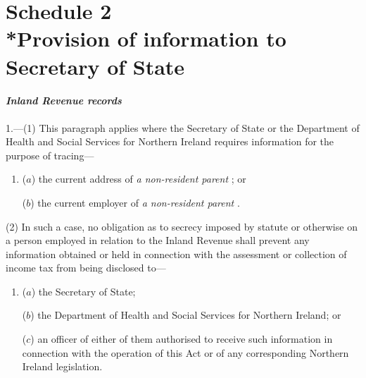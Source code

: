 \documentclass[12pt,a4paper]{article}
\begin{document}

\part[Schedule 2 --- Provision of information to Secretary of State]{Schedule 2\\*Provision of information to Secretary of State}

\renewcommand\parthead{--- Schedule 2}

\subsection*{\itshape Inland Revenue records}

1.---(1) This paragraph applies where the Secretary of State or the Department of Health and Social Services for Northern Ireland requires information for the purpose of tracing—
\begin{enumerate}\item[]
($a$) the current address of 
\emph{a non-resident parent}%
; or

($b$) the current employer of 
\emph{a non-resident parent}%
.
\end{enumerate}

(2) In such a case, no obligation as to secrecy imposed by statute or otherwise on a person employed in relation to the Inland Revenue shall prevent any information obtained or held in connection with the assessment or collection of income tax from being disclosed to—
\begin{enumerate}\item[]
($a$) the Secretary of State;

($b$) the Department of Health and Social Services for Northern Ireland; or

($c$) an officer of either of them authorised to receive such information in connection with the operation of this Act or of any corresponding Northern Ireland legislation.
\end{enumerate}
\end{document}

